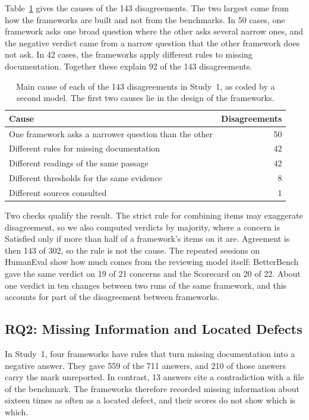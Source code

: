 \documentclass[runningheads]{llncs}
\begin{document}
Table~\ref{tab:causes} gives the causes of the 143 disagreements. The two largest come from how the frameworks are built and not from the benchmarks. In 50 cases, one framework asks one broad question where the other asks several narrow ones, and the negative verdict came from a narrow question that the other framework does not ask. In 42 cases, the frameworks apply different rules to missing documentation. Together these explain 92 of the 143 disagreements.

\begin{table}[t]
\caption{Main cause of each of the 143 disagreements in Study~1, as coded by a second model. The first two causes lie in the design of the frameworks.}
\label{tab:causes}
\centering
\footnotesize
\begin{tabularx}{\textwidth}{@{}>{\raggedright\arraybackslash}Xr@{}}
\toprule
\textbf{Cause} & \textbf{Disagreements} \\
\midrule
One framework asks a narrower question than the other & 50 \\
Different rules for missing documentation & 42 \\
Different readings of the same passage & 42 \\
Different thresholds for the same evidence & 8 \\
Different sources consulted & 1 \\
\bottomrule
\end{tabularx}
\end{table}

Two checks qualify the result. The strict rule for combining items may exaggerate disagreement, so we also computed verdicts by majority, where a concern is Satisfied only if more than half of a framework's items on it are. Agreement is then 143 of 302, so the rule is not the cause. The repeated sessions on HumanEval show how much comes from the reviewing model itself: BetterBench gave the same verdict on 19 of 21 concerns and the Scorecard on 20 of 22. About one verdict in ten changes between two runs of the same framework, and this accounts for part of the disagreement between frameworks.

\subsection{RQ2: Missing Information and Located Defects}
In Study~1, four frameworks have rules that turn missing documentation into a negative answer. They gave 559 of the 711 answers, and 210 of those answers carry the mark unreported. In contrast, 13 answers cite a contradiction with a file of the benchmark. The frameworks therefore recorded missing information about sixteen times as often as a located defect, and their scores do not show which is which.
\end{document}
